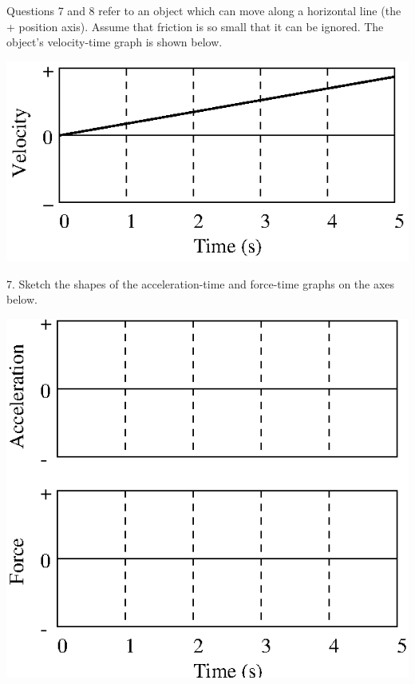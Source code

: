 Questions 7 and 8 refer to an object which can move along a horizontal line
(the + position axis). Assume that friction is so small that it can be ignored.
The object's velocity-time graph is shown below.

\vspace{0.3cm}
{\par\centering \includegraphics{force1_fig11.eps} \par}
\vspace{0.3cm}

7. Sketch the shapes of the acceleration-time and force-time graphs on the axes
below.

\vspace{0.3cm}
{\par\centering \includegraphics{force1_fig9.eps} \par}
\vspace{0.3cm}

